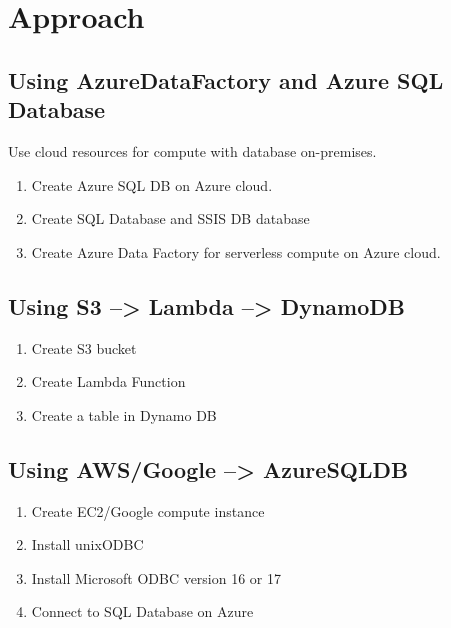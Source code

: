 \chapter{Approach}\label{chap:approach}

\section{Using AzureDataFactory and Azure SQL Database}
Use cloud resources for compute with database on-premises. 

\begin{enumerate}
 \item Create Azure SQL DB on Azure cloud.
 \item Create SQL Database and SSIS DB database
 \item Create Azure Data Factory for serverless compute on Azure cloud.
\end{enumerate} 

\section{Using S3 --> Lambda --> DynamoDB} 

\begin{enumerate}
 \item Create S3 bucket
 \item Create Lambda Function
 \item Create a table in Dynamo DB
\end{enumerate}

\section{Using AWS/Google --> AzureSQLDB} 

\begin{enumerate}
 \item Create EC2/Google compute instance
 \item Install unixODBC
 \item Install Microsoft ODBC version 16 or 17
 \item Connect to SQL Database on Azure
\end{enumerate}
